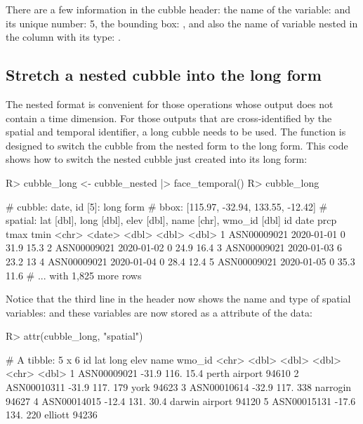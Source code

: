 \documentclass[
]{jss}
\begin{document}
There are a few information in the cubble header: the name of the
 variable:  and its unique number: 5, the bounding
box: \code{[115.97, -32.94, 133.55, -12.42]} , and also the name of
variable nested in the  column with its type:
.

\hypertarget{stretch-a-nested-cubble-into-the-long-form}{%
\subsection{Stretch a nested cubble into the long
form}\label{stretch-a-nested-cubble-into-the-long-form}}

The nested format is convenient for those operations whose output does
not contain a time dimension. For those outputs that are
cross-identified by the spatial and temporal identifier, a long cubble
needs to be used. The function  is designed to switch
the cubble from the nested form to the long form. This code shows how to
switch the nested cubble just created into its long form:

\begin{CodeChunk}
\begin{CodeInput}
R> cubble_long <- cubble_nested |> face_temporal()
R> cubble_long
\end{CodeInput}
\begin{CodeOutput}
# cubble:  date, id [5]: long form
# bbox:    [115.97, -32.94, 133.55, -12.42]
# spatial: lat [dbl], long [dbl], elev [dbl], name [chr], wmo_id [dbl]
  id          date        prcp  tmax  tmin
  <chr>       <date>     <dbl> <dbl> <dbl>
1 ASN00009021 2020-01-01     0  31.9  15.3
2 ASN00009021 2020-01-02     0  24.9  16.4
3 ASN00009021 2020-01-03     6  23.2  13  
4 ASN00009021 2020-01-04     0  28.4  12.4
5 ASN00009021 2020-01-05     0  35.3  11.6
# ... with 1,825 more rows
\end{CodeOutput}
\end{CodeChunk}

Notice that the third line in the header now shows the name and type of
spatial variables:
 and
these variables are now stored as a  attribute of the
data:

\begin{CodeChunk}
\begin{CodeInput}
R> attr(cubble_long, "spatial")
\end{CodeInput}
\begin{CodeOutput}
# A tibble: 5 x 6
  id            lat  long  elev name           wmo_id
  <chr>       <dbl> <dbl> <dbl> <chr>           <dbl>
1 ASN00009021 -31.9  116.  15.4 perth airport   94610
2 ASN00010311 -31.9  117. 179   york            94623
3 ASN00010614 -32.9  117. 338   narrogin        94627
4 ASN00014015 -12.4  131.  30.4 darwin airport  94120
5 ASN00015131 -17.6  134. 220   elliott         94236
\end{CodeOutput}
\end{CodeChunk}
\end{document}
